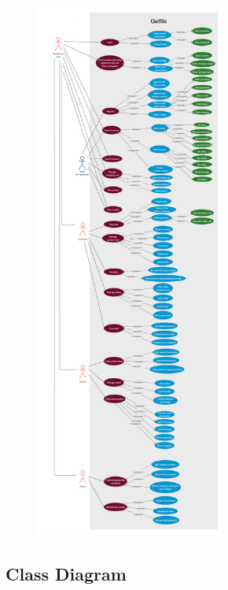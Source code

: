 \documentclass[]{article}
\begin{document}
\begin{figure}[H]
    \centering
    \includegraphics[height=7in]{./images/50.jpg}
\end{figure}

\hypertarget{class-diagram-1}{%
    \subsection{Class Diagram}\label{class-diagram-1}}
\end{document}
